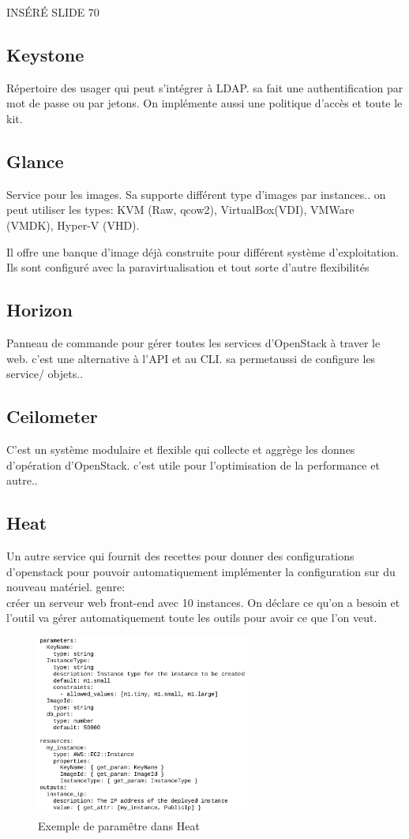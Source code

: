 \documentclass[oneside]{book}
\begin{document}
INSÉRÉ SLIDE 70
\subsection{Keystone}
Répertoire des usager qui peut s'intégrer à LDAP. sa fait une authentification par mot de passe ou par jetons. On implémente aussi une politique d'accès et toute le kit.
\subsection{Glance}
Service pour les images. Sa supporte différent type d'images par instances.. on peut utiliser les types: KVM (Raw, qcow2), VirtualBox(VDI), VMWare (VMDK), Hyper-V (VHD). 

Il offre une banque d'image déjà construite pour différent système d'exploitation. Ils sont configuré avec la paravirtualisation et tout sorte d'autre flexibilités
\subsection{Horizon}
Panneau de commande pour gérer toutes les services d'OpenStack à traver le web. c'est une alternative à l'API et au CLI. sa permetaussi de configure les service/ objets..
\subsection{Ceilometer}
C'est un système modulaire et flexible qui collecte et aggrège les donnes d'opération d'OpenStack. c'est utile pour l'optimisation de la performance et autre..
\subsection{Heat}
Un autre service qui fournit des recettes pour donner des configurations d'openstack pour pouvoir automatiquement implémenter la configuration sur du nouveau matériel. genre:\\

créer un serveur web front-end avec 10 instances. On déclare ce qu'on a besoin et l'outil va gérer automatiquement toute les outils pour avoir ce que l'on veut.

\begin{figure}[!ht]
\centering
\includegraphics[width = 7cm]{exemple_parametre.png}
\caption{Exemple de paramêtre dans Heat}
\end{figure}
\end{document}
